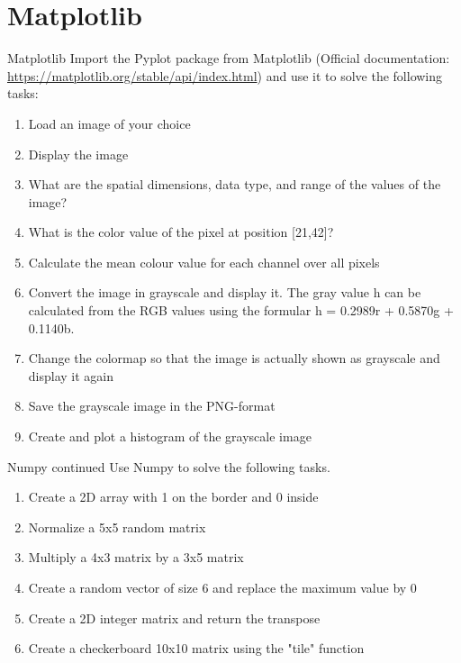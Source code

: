 \documentclass[twoside]{article}
\begin{document}
\section{Matplotlib}
\begin{task}{Matplotlib}{}{}
Import the Pyplot package from Matplotlib (Official documentation: \href{https://matplotlib.org/stable/api/index.html}{https://matplotlib.org/stable/api/index.html}) and use it to solve the following tasks:

\begin{enumerate}
    \item Load an image of your choice
    \item Display the image
    \item What are the spatial dimensions, data type, and range of the values of the image?
    \item What is the color value of the pixel at position [21,42]?
    \item Calculate the mean colour value for each channel over all pixels
    \item Convert the image in grayscale and display it. The gray value h can be calculated from the RGB values using the formular h = 0.2989r + 0.5870g + 0.1140b.
    \item Change the colormap so that the image is actually shown as grayscale and display it again
    \item Save the grayscale image in the PNG-format
    \item Create and plot a histogram of the grayscale image
\end{enumerate}
\end{task}

\begin{task}{Numpy continued}{}{}
Use Numpy to solve the following tasks.
\begin{enumerate}
    \item Create a 2D array with 1 on the border and 0 inside
    \item Normalize a 5x5 random matrix
    \item Multiply a 4x3 matrix by a 3x5 matrix
    \item Create a random vector of size 6 and replace the maximum value by 0
    \item Create a 2D integer matrix and return the transpose
    \item Create a checkerboard 10x10 matrix using the "tile" function
\end{enumerate}
\end{task}
\end{document}
